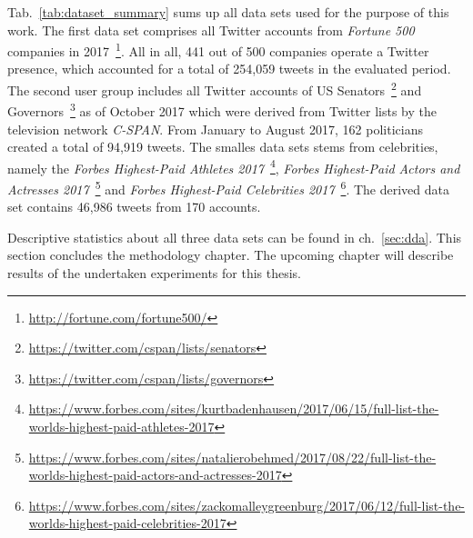 Tab.~\ref{tab:dataset_summary} sums up all data sets used for the purpose of
this work.
The first data set comprises all Twitter accounts from \textit{Fortune 500}
companies in 2017~\footnote{\url{http://fortune.com/fortune500/}}.
All in all, 441 out of 500 companies operate a Twitter presence, which accounted
for a total of 254,059 tweets in the evaluated period.
The second user group includes all Twitter accounts of US Senators~\footnote{\url{https://twitter.com/cspan/lists/senators}} and Governors~\footnote{\url{https://twitter.com/cspan/lists/governors}}
as of October 2017 which were derived from Twitter lists by the television
network \textit{C-SPAN}.
From January to August 2017, 162 politicians created a total of 94,919 tweets.
The smalles data sets stems from celebrities, namely the \textit{Forbes Highest-Paid
Athletes 2017}~\footnote{\url{https://www.forbes.com/sites/kurtbadenhausen/2017/06/15/full-list-the-worlds-highest-paid-athletes-2017}}, \textit{Forbes Highest-Paid Actors and Actresses 2017}~\footnote{\url{https://www.forbes.com/sites/natalierobehmed/2017/08/22/full-list-the-worlds-highest-paid-actors-and-actresses-2017}} and
\textit{Forbes Highest-Paid Celebrities 2017}~\footnote{\url{https://www.forbes.com/sites/zackomalleygreenburg/2017/06/12/full-list-the-worlds-highest-paid-celebrities-2017}}.
The derived data set contains 46,986 tweets from 170 accounts.

Descriptive statistics about all three data sets can be found in ch.~\ref{sec:dda}.
This section concludes the methodology chapter.
The upcoming chapter will describe results of the undertaken experiments for
this thesis.
